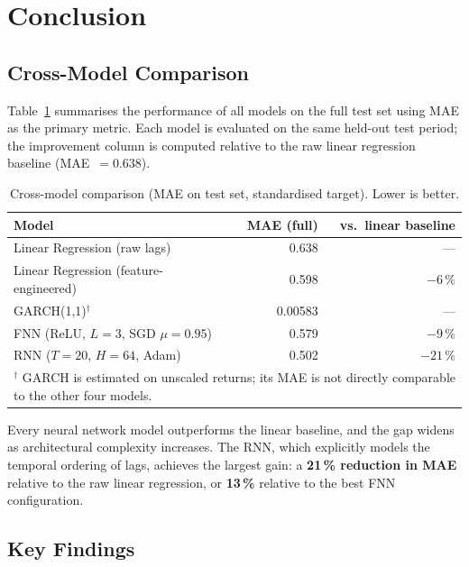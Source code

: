 \section{Conclusion}
\label{sec:conclusion}

\subsection{Cross-Model Comparison}

Table~\ref{tab:final_comparison} summarises the performance of all models on
the full test set using MAE as the primary metric. Each model is evaluated on the
same held-out test period; the improvement column is computed relative to the
raw linear regression baseline (MAE~$= 0.638$).

\begin{table}[H]
  \centering
  \caption{Cross-model comparison (MAE on test set, standardised target).
    Lower is better.}
  \label{tab:final_comparison}
  \begin{tabular}{lrr}
    \toprule
    Model & MAE (full) & vs.\ linear baseline \\
    \midrule
    Linear Regression (raw lags)                    & 0.638  & --- \\
    Linear Regression (feature-engineered)          & 0.598  & $-6\,\%$ \\
    GARCH(1,1)$^\dagger$                            & 0.00583 & --- \\
    FNN (ReLU, $L=3$, SGD $\mu=0.95$)              & 0.579  & $-9\,\%$ \\
    RNN ($T=20$, $H=64$, Adam)                     & 0.502  & $-21\,\%$ \\
    \bottomrule
    \multicolumn{3}{l}{\footnotesize
      $^\dagger$ GARCH is estimated on unscaled returns; its MAE is not
      directly comparable to the other four models.}
  \end{tabular}
\end{table}

\noindent Every neural network model outperforms the linear baseline, and the
gap widens as architectural complexity increases. The RNN, which explicitly
models the temporal ordering of lags, achieves the largest gain: a
\textbf{21\,\% reduction in MAE} relative to the raw linear regression, or
\textbf{13\,\%} relative to the best FNN configuration.

\subsection{Key Findings}

